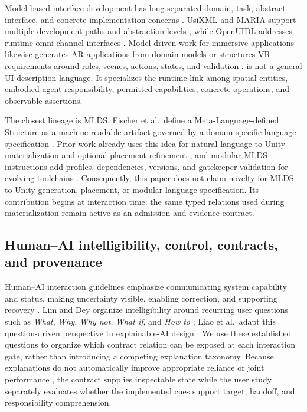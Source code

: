 Model-based interface development has long separated domain, task, abstract
interface, and concrete implementation concerns
\cite{puerta1999framework,calvary2003cameleon}.  UsiXML and MARIA support
multiple development paths and abstraction levels
\cite{limbourg2005usixml,paterno2009maria}, while OpenUIDL addresses runtime
omni-channel interfaces \cite{moldovan2020openuidl}.  Model-driven work for
immersive applications likewise generates AR applications from domain models
\cite{camposlopez2023mdear} or structures VR requirements around roles,
scenes, actions, states, and validation \cite{karre2024vrrequirements}.
\systemname{} is not a general UI description language.  It specializes the
runtime link among spatial entities, embodied-agent responsibility, permitted
capabilities, concrete operations, and observable assertions.

The closest lineage is MLDS.  Fischer et al.\ define a
Meta-Language-defined Structure as a machine-readable artifact governed by a
domain-specific language specification \cite{fischer2025machinereadable}.
Prior work already uses this idea for natural-language-to-Unity materialization
and optional placement refinement \cite{burk2025dynamicvr}, and modular MLDS
instructions add profiles, dependencies, versions, and gatekeeper validation
for evolving toolchains \cite{burk2026modular}.  Consequently, this paper does
not claim novelty for MLDS-to-Unity generation, placement, or modular language
specification.  Its contribution begins at interaction time: the same typed
relations used during materialization remain active as an admission and
evidence contract.

\subsection{Human--AI intelligibility, control, contracts, and provenance}

Human--AI interaction guidelines emphasize communicating system capability and
status, making uncertainty visible, enabling correction, and supporting
recovery \cite{amershi2019guidelines,yang2020reexamining,weisz2024design}.
Lim and Dey organize intelligibility around recurring user questions such as
\emph{What}, \emph{Why}, \emph{Why not}, \emph{What if}, and \emph{How to}
\cite{lim2009demand}; Liao et al.\ adapt this question-driven perspective to
explainable-AI design \cite{liao2020questioning}.  We use these established
questions to organize which contract relation can be exposed at each
interaction gate, rather than introducing a competing explanation taxonomy.
Because explanations do not automatically improve appropriate reliance or
joint performance \cite{bansal2021whole}, the contract supplies inspectable
state while the user study separately evaluates whether the implemented cues
support target, handoff, and responsibility comprehension.

